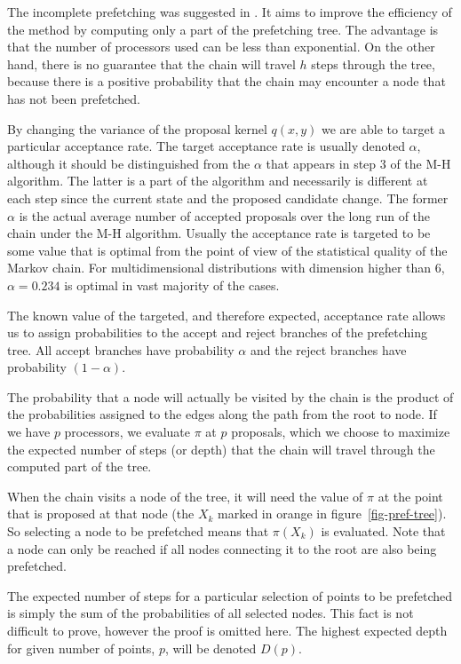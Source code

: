 \documentclass[11pt,letterpaper]{article}       %
\begin{document}
The incomplete prefetching was suggested in \cite{strid2010efficient}.  It aims 
to improve the efficiency of the method by computing only a part of the prefetching 
tree.  The advantage is that the number of processors used can be less than exponential.
On the other hand, there is no guarantee that the chain will travel $h$ steps through 
the tree, because there is a positive probability that the chain may encounter
a node that has not been prefetched.

By changing the variance of the proposal kernel $q(x,y)$ we are able to target
a particular acceptance rate.  The target acceptance rate is usually denoted
$\alpha$, although it should be distinguished from the $\alpha$ that appears in
step 3 of the M-H algorithm. The latter is a part of the algorithm and
necessarily is different at each step since the current state and the proposed
candidate change.  The former $\alpha$ is the actual average number of accepted
proposals over the long run of the chain under the M-H algorithm.  Usually the
acceptance rate is targeted to be some value that is optimal from the point of
view of the statistical quality of the Markov chain.  For multidimensional
distributions with dimension higher than 6, $\alpha = 0.234$ is optimal in vast
majority of the cases.

The known value of the targeted, and therefore expected, acceptance rate allows
us to assign probabilities to the accept and reject branches of the prefetching
tree.  All accept branches have probability $\alpha$ and the reject branches
have probability $(1-\alpha)$.

The probability that a node will actually be visited by the chain is the
product of the probabilities assigned to the edges along the path from the root
to node.  If we have $p$ processors, we  evaluate $\pi$ at $p$ proposals, which
we choose to maximize the expected number of steps (or depth) that the chain
will travel through the computed part of the tree.  

When the chain visits a node of the tree, it will need the value of $\pi$ at
the point that is proposed at that node (the $X_k$ marked in orange in
figure~\ref{fig-pref-tree}).  So selecting a node to be prefetched means that
$\pi(X_k)$ is evaluated.  Note that a node can only be reached if all nodes
connecting it to the root are also being prefetched. 

The expected number of steps for a particular selection of points to be
prefetched is simply the sum of the probabilities of all selected nodes.  This
fact is not difficult to prove, however the proof is omitted here.  The highest
expected depth for given number of points, $p$, will be denoted $D(p)$.
\end{document}
